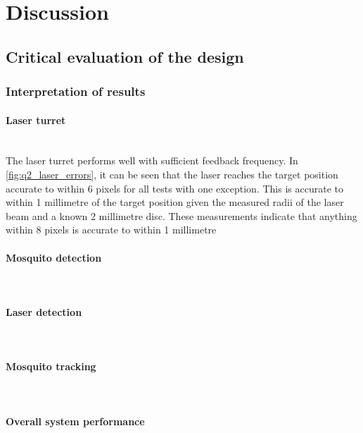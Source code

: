 
\section{Discussion}

\subsection{Critical evaluation of the design}

\subsubsection{Interpretation of results}
\paragraph{Laser turret}\hfill\\
The laser turret performs well with sufficient feedback frequency. In \autoref{fig:q2_laser_errors}, it can be seen that the laser reaches the target position accurate to within 6 pixels for all tests with one exception. This is accurate to within 1 millimetre of the target position given the measured radii of the laser beam and a known 2 millimetre disc. These measurements indicate that anything within 8 pixels is accurate to within 1 millimetre

\paragraph{Mosquito detection}\hfill\\


\paragraph{Laser detection}\hfill\\


\paragraph{Mosquito tracking}\hfill\\


\paragraph{Overall system performance}\hfill\\

